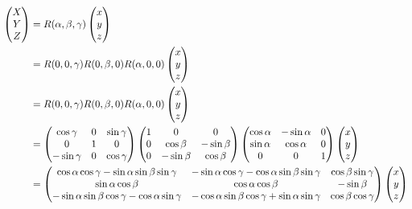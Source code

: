 \documentclass[10pt]{article}
\begin{document}
\begin{align}
\begin{pmatrix}
X \\ Y \\ Z
\end{pmatrix}
&= R(\alpha, \beta, \gamma) 
\begin{pmatrix}
  x \\ y \\ z
\end{pmatrix}
%
\\&= R(0, 0, \gamma) R(0, \beta, 0) R (\alpha, 0 , 0) 
\begin{pmatrix}
  x \\ y \\ z
\end{pmatrix}
%
\\&= R(0, 0, \gamma) R(0, \beta, 0) R (\alpha, 0 , 0) 
\begin{pmatrix}
  x \\ y \\ z
\end{pmatrix}
%
\\&=
\begin{pmatrix}
  \cg & 0 & \sg \\
  0 & 1 & 0 \\
  -\sg & 0 & \cg
\end{pmatrix}
\begin{pmatrix}
  1 & 0 & 0 \\
  0 & \cb & -\sb \\
  0 & -\sb & \cb \\
\end{pmatrix}
\begin{pmatrix}
  \ca & -\sa & 0 \\
  \sa & \ca & 0 \\
  0 & 0 & 1
\end{pmatrix}
\begin{pmatrix}
  x \\ y \\ z
\end{pmatrix}
\\&= 
\begin{pmatrix}
\ca\cg-\sa\sb\sg & -\sa\cg - \ca\sb\sg & \cb\sg \\ 
\sa\cb & \ca\cb & -\sb \\
-\sa\sb\cg - \ca\sg & -\ca\sb\cg + \sa\sg & \cb\cg
\end{pmatrix}
\begin{pmatrix}
  x \\ y \\ z
\end{pmatrix}
\label{eq:rotationmatrix}
\end{align}
\end{document}
